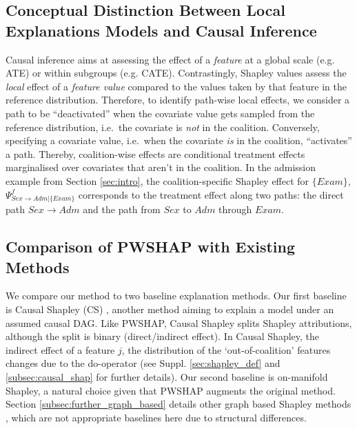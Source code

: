 \documentclass{article}
\theoremstyle{plain}
\theoremstyle{definition}
\theoremstyle{remark}
\newcommand{\effect}{\Psi}
\theoremstyle{mystyle}
\begin{document}
\subsection{Conceptual Distinction Between Local Explanations Models and Causal Inference}
Causal inference aims at assessing the effect of a \emph{feature} at a global scale (e.g. ATE) or within subgroups (e.g. CATE). Contrastingly, Shapley values assess the \emph{local} effect of a \emph{feature value} compared to the values taken by that feature in the reference distribution. Therefore, to identify path-wise local effects, we consider a path to be ``deactivated'' when the covariate value gets sampled from the reference distribution, i.e.\ the covariate is \emph{not} in the coalition. Conversely, specifying a covariate value, i.e.\ when the covariate \emph{is} in the coalition, ``activates'' a path. Thereby, coalition-wise effects are conditional treatment effects marginalised over covariates that aren't in the coalition. In the admission example from Section \ref{sec:intro}, the coalition-specific Shapley effect for $\{Exam\}$, $\effect^f_{Sex \rightarrow Adm| \{Exam\}}$ corresponds to the treatment effect along two paths: the direct path $Sex \rightarrow Adm$ and the path from $Sex$ to $Adm$ through $Exam$. 
\subsection{Comparison of PWSHAP with Existing Methods}
\label{sec:comparison}
We compare our method to two baseline explanation methods. Our first baseline is Causal Shapley (CS) , another method aiming to explain a model under an assumed causal DAG. Like PWSHAP, Causal Shapley splits Shapley attributions, although the split is binary (direct/indirect effect). In Causal Shapley, the indirect effect of a feature $j$, the distribution of the ‘out-of-coalition’ features changes due to the do-operator (see Suppl. \ref{sec:shapley_def} and \ref{subsec:causal_shap} for further details). Our second baseline is on-manifold Shapley, a natural choice given that PWSHAP augments the original method. Section \ref{subsec:further_graph_based} details other graph based Shapley methods , which are not appropriate baselines here due to structural differences. %
\end{document}

